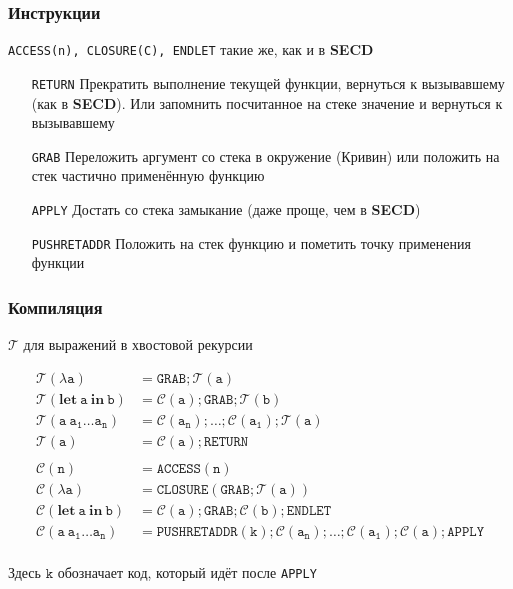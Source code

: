 \begin{frame}
  \frametitle{Инструкции}
  \begin{wide}
    \texttt{ACCESS(n), CLOSURE(C), ENDLET} такие же, как и в \textbf{SECD}
  \end{wide}
  \begin{itemize}
    \item[\color{teal}\texttt{RETURN}] Прекратить выполнение текущей функции, вернуться к вызывавшему (как в \textbf{SECD}).
          Или запомнить посчитанное на стеке значение и вернуться к вызывавшему
    \item[\color{teal}\texttt{GRAB}] Переложить аргумент со стека в окружение (Кривин) или положить на стек частично применённую функцию
    \item[\color{teal}\texttt{APPLY}] Достать со стека замыкание (даже проще, чем в \textbf{SECD})
    \item[\color{teal}\texttt{PUSHRETADDR}] Положить на стек функцию и пометить точку применения функции
  \end{itemize}
\end{frame}

\begin{frame}
  \frametitle{Компиляция}
  $\mathcal{T}$ для выражений в хвостовой рекурсии
  \begin{wide}
    \begin{align*}
      \mathcal{T}\mathtt{(\lambda a)}                         & = \mathtt{GRAB;\mathcal{T}(a)}                                                         \\
      \mathcal{T}\mathtt{(\mathbf{let}\ a \ \mathbf{in} \ b)} & = \mathtt{\mathcal{C}(a);GRAB;\mathcal{T}(b)}                                          \\
      \mathcal{T}\mathtt{(a\ a_1 \dots a_n) }                 & = \mathtt{\mathcal{C}(a_n);\dots; \mathcal{C}(a_1);\mathcal{T}(a)}                     \\
      \mathcal{T}\mathtt{(a)}                                 & = \mathtt{\mathcal{C}(a); RETURN}                                                      \\
      \\
      \mathcal{C}\mathtt{(n)}                                 & = \mathtt{ACCESS(n)}                                                                   \\
      \mathcal{C}\mathtt{(\lambda a)}                         & = \mathtt{CLOSURE(GRAB;\mathcal{T}(a))}                                                \\
      \mathcal{C}\mathtt{(\mathbf{let}\ a\ \mathbf{in}\ b)}   & = \mathtt{\mathcal{C}(a);GRAB;\mathcal{C}(b);ENDLET}                                   \\
      \mathcal{C}\mathtt{(a\ a_1 \dots a_n)}                  & = \mathtt{PUSHRETADDR(k);\mathcal{C}(a_n);\dots;\mathcal{C}(a_1);\mathcal{C}(a);APPLY} \\
    \end{align*}
  \end{wide}
  Здесь $\mathtt{k}$  обозначает код, который идёт после \texttt{APPLY}
\end{frame}

